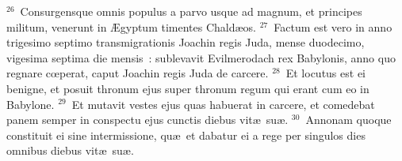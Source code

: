 ${}^{26}$~Consurgensque omnis populus a parvo usque ad magnum, et principes militum, venerunt in \AE gyptum timentes Chald\ae os.
${}^{27}$~Factum est vero in anno trigesimo septimo transmigrationis Joachin regis Juda, mense duodecimo, vigesima septima die mensis~: sublevavit Evilmerodach rex Babylonis, anno quo regnare cœperat, caput Joachin regis Juda de carcere.
${}^{28}$~Et locutus est ei benigne, et posuit thronum ejus super thronum regum qui erant cum eo in Babylone.
${}^{29}$~Et mutavit vestes ejus quas habuerat in carcere, et comedebat panem semper in conspectu ejus cunctis diebus vit\ae\ su\ae .
${}^{30}$~Annonam quoque constituit ei sine intermissione, qu\ae\ et dabatur ei a rege per singulos dies omnibus diebus vit\ae\ su\ae .
